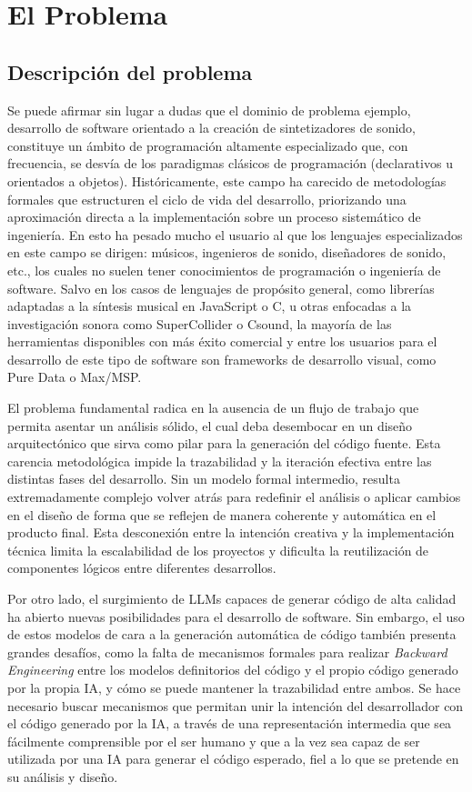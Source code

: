 \section{El Problema}


\subsection{Descripción del problema}

Se puede afirmar sin lugar a dudas que el dominio de problema ejemplo, desarrollo de software orientado a la creación de sintetizadores de sonido, constituye un ámbito de programación altamente especializado que, con frecuencia, se desvía de los paradigmas clásicos de programación (declarativos u orientados a objetos). Históricamente, este campo ha carecido de metodologías formales que estructuren el ciclo de vida del desarrollo, priorizando una aproximación directa a la implementación sobre un proceso sistemático de ingeniería. En esto ha pesado mucho el usuario al que los lenguajes especializados en este campo se dirigen: músicos, ingenieros de sonido, diseñadores de sonido, etc., los cuales no suelen tener conocimientos de programación o ingeniería de software. Salvo en los casos de lenguajes de propósito general, como librerías adaptadas a la síntesis musical en JavaScript o C, u otras enfocadas a la investigación sonora como SuperCollider o Csound, la mayoría de las herramientas disponibles con más éxito comercial y entre los usuarios para el desarrollo de este tipo de software son frameworks de desarrollo visual, como Pure Data o Max/MSP.

El problema fundamental radica en la ausencia de un flujo de trabajo que permita asentar un análisis sólido, el cual deba desembocar en un diseño arquitectónico que sirva como pilar para la generación del código fuente. Esta carencia metodológica impide la trazabilidad y la iteración efectiva entre las distintas fases del desarrollo. Sin un modelo formal intermedio, resulta extremadamente complejo volver atrás para redefinir el análisis o aplicar cambios en el diseño de forma que se reflejen de manera coherente y automática en el producto final. Esta desconexión entre la intención creativa y la implementación técnica limita la escalabilidad de los proyectos y dificulta la reutilización de componentes lógicos entre diferentes desarrollos.

Por otro lado, el surgimiento de LLMs capaces de generar código de alta calidad ha abierto nuevas posibilidades para el desarrollo de software. Sin embargo, el uso de estos modelos de cara a la generación automática de código también presenta grandes desafíos, como la falta de mecanismos formales para realizar \textit{Backward Engineering} entre los modelos definitorios del código y el propio código generado por la propia IA, y cómo se puede mantener la trazabilidad entre ambos. Se hace necesario buscar mecanismos que permitan unir la intención del desarrollador con el código generado por la IA, a través de una representación intermedia que sea fácilmente comprensible por el ser humano y que a la vez sea capaz de ser utilizada por una IA para generar el código esperado, fiel a lo que se pretende en su análisis y diseño.


